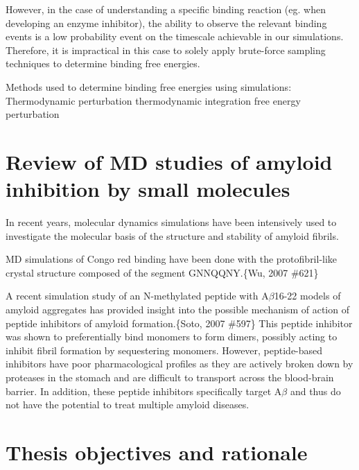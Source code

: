 \begin{outline}
	\1 However, in the case of understanding a specific binding reaction (eg. when developing an enzyme inhibitor), the ability to observe the relevant binding events is a low probability event on the timescale achievable in our simulations. Therefore, it is  impractical in this case to solely apply brute-force sampling techniques to determine binding free energies.

	  \2 Methods used to determine binding free energies using simulations:
	  	\3 Thermodynamic perturbation \cite{Gilson:2007hz}
			\4 thermodynamic integration
			\4 free energy perturbation
\end{outline}

\section{Review of MD studies of amyloid inhibition by small molecules}

\begin{outline}
	\1 In recent years, molecular dynamics simulations have been intensively used to investigate the molecular basis of the structure and stability of amyloid fibrils. 
	
	\1 MD simulations of Congo red binding have been done with the protofibril-like crystal structure composed of the segment GNNQQNY.\{Wu, 2007 \#621\}
	
	\1 A recent simulation study of an N-methylated peptide with A$\beta$16-22 models of amyloid aggregates has provided insight into the possible mechanism of action of peptide inhibitors of amyloid formation.\{Soto, 2007 \#597\} This peptide inhibitor was shown to preferentially bind monomers to form dimers, possibly acting to inhibit fibril formation by sequestering monomers. However, peptide-based inhibitors have poor pharmacological profiles as they are actively broken down by proteases in the stomach and are difficult to transport across the blood-brain barrier. In addition, these peptide inhibitors specifically target A$\beta$ and thus do not have the potential to treat multiple amyloid diseases.
\end{outline}


\section{Thesis objectives and rationale}
